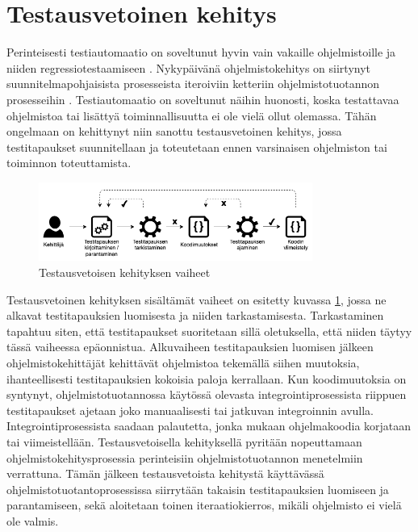 \section{Testausvetoinen kehitys} \label{ch:07_testausvetoinen_kehitys}

  Perinteisesti testiautomaatio on soveltunut hyvin vain vakaille ohjelmistoille ja niiden regressiotestaamiseen \parencite{regression_testing_traditionally}.
  Nykypäivänä ohjelmistokehitys on siirtynyt suunnitelmapohjaisista prosesseista iteroiviin ketteriin ohjelmistotuotannon prosesseihin \parencite{waterfall_to_agile}.
  Testiautomaatio on soveltunut näihin huonosti, koska testattavaa ohjelmistoa tai lisättyä toiminnallisuutta ei ole vielä ollut olemassa.
  Tähän ongelmaan on kehittynyt niin sanottu testausvetoinen kehitys, jossa testitapaukset suunnitellaan ja toteutetaan ennen varsinaisen ohjelmiston tai toiminnon toteuttamista.

  \begin{figure}[H]
    \centering
    \includegraphics[width=0.8\textwidth]{assets/testausvetoinen-kehitys.png}
    \caption{Testausvetoisen kehityksen vaiheet \parencite{tdd_steps}}
    \label{fig:testausvetoinen-kehitys}
  \end{figure}

  Testausvetoinen kehityksen sisältämät vaiheet on esitetty kuvassa \ref{fig:testausvetoinen-kehitys}, jossa ne alkavat testitapauksien luomisesta ja niiden tarkastamisesta.
  Tarkastaminen tapahtuu siten, että testitapaukset suoritetaan sillä oletuksella, että niiden täytyy tässä vaiheessa epäonnistua.
  Alkuvaiheen testitapauksien luomisen jälkeen ohjelmistokehittäjät kehittävät ohjelmistoa tekemällä siihen muutoksia, ihanteellisesti testitapauksien kokoisia paloja kerrallaan.
  Kun koodimuutoksia on syntynyt, ohjelmistotuotannossa käytössä olevasta integrointiprosessista riippuen testitapaukset ajetaan joko manuaalisesti tai jatkuvan integroinnin avulla.
  Integrointiprosessista saadaan palautetta, jonka mukaan ohjelmakoodia korjataan tai viimeistellään.
  Testausvetoisella kehityksellä pyritään nopeuttamaan ohjelmistokehitysprosessia perinteisiin ohjelmistotuotannon menetelmiin verrattuna.
  Tämän jälkeen testausvetoista kehitystä käyttävässä ohjelmistotuotantoprosessissa siirrytään takaisin testitapauksien luomiseen ja parantamiseen, sekä aloitetaan toinen iteraatiokierros, mikäli ohjelmisto ei vielä ole valmis.

